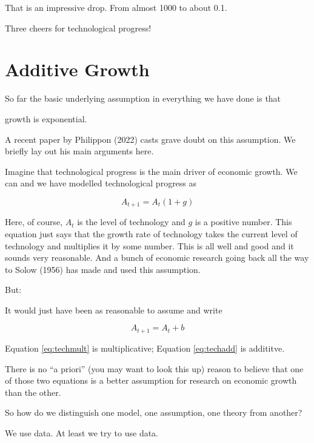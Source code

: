 \documentclass[
]{book}
\begin{document}
That is an impressive drop. From almost 1000 to about 0.1.

Three cheers for technological progress!

\hypertarget{additive-growth}{%
\section{Additive Growth}\label{additive-growth}}

So far the basic underlying assumption in everything we have done is that

\begin{center}
growth is exponential.

\end{center}

A recent paper by Philippon (2022) casts grave doubt on this assumption. We briefly lay out his main arguments here.

Imagine that technological progress is the main driver of economic growth. We can and we have modelled technological progress as

\begin{equation}
A_{t+1}=A_t(1+g)
\label{eq:techmult}
\end{equation}

Here, of course, \(A_t\) is the level of technology and \(g\) is a positive number. This equation just says that the growth rate of technology takes the current level of technology and multiplies it by some number. This is all well and good and it sounds very reasonable. And a bunch of economic research going back all the way to Solow (1956) has made and used this assumption.

But:

It would just have been as reasonable to assume and write

\begin{equation}
A_{t+1}=A_t + b
\label{eq:techadd}
\end{equation}

Equation \eqref{eq:techmult} is multiplicative; Equation \eqref{eq:techadd} is addititve.

There is no ``a priori'' (you may want to look this up) reason to believe that one of those two equations is a better assumption for research on economic growth than the other.

So how do we distinguish one model, one assumption, one theory from another?

We use data. At least we try to use data.
\end{document}
